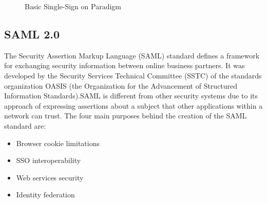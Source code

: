 \begin{figure}[h!]
\begin{center}
\end{center}
\caption {Basic Single-Sign on Paradigm}
\label{vmb2}
\vspace{0mm}
\end{figure} 

\subsection{SAML 2.0}
\hspace{5mm} The Security Assertion Markup Language
(SAML) standard defines a framework for exchanging security information between online business partners. It was developed by the Security Services Technical Committee (SSTC) of the standards organization OASIS (the Organization for the Advancement of Structured Information Standards).SAML is different from other security systems due to its approach of expressing assertions about a subject that other applications within a network can trust. 
The four main purposes behind the
creation of the SAML standard are:
\begin{itemize}
\item Browser cookie limitations
\item SSO interoperability
\item Web services security
\item Identity federation
\end{itemize}

